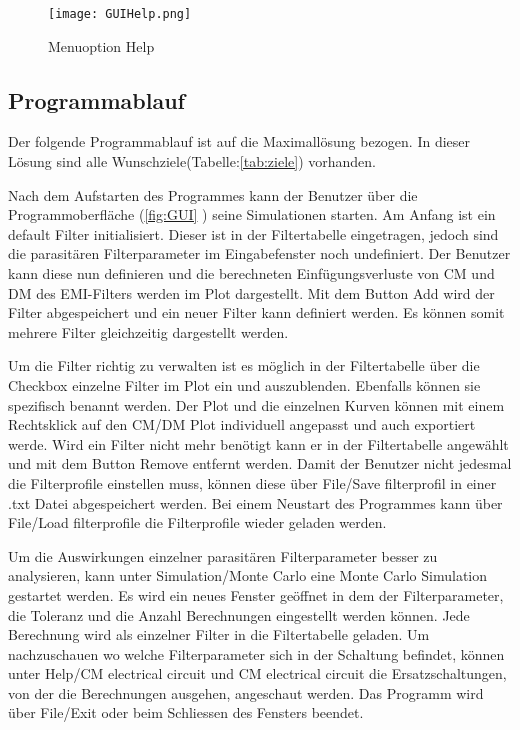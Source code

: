 \begin{figure}[H]
	\centering
	\texttt{[image: GUIHelp.png]}
	\caption{Menuoption Help}
	\label{fig:GUIHelp}
\end{figure}


\newpage

\subsection{Programmablauf} \label{subsec:programmablauf}

Der folgende Programmablauf ist auf die Maximallösung bezogen. In dieser Lösung sind alle Wunschziele(Tabelle:\ref{tab:ziele}) vorhanden.

Nach dem Aufstarten des Programmes kann der Benutzer über die Programmoberfläche (\ref{fig:GUI} ) seine Simulationen starten.
Am Anfang ist ein default Filter initialisiert. Dieser ist in der Filtertabelle eingetragen, jedoch sind die parasitären Filterparameter im Eingabefenster noch undefiniert. Der Benutzer kann diese nun definieren und die berechneten Einfügungsverluste von CM und DM des EMI-Filters werden im Plot dargestellt. Mit dem Button Add wird der Filter abgespeichert und ein neuer Filter kann definiert werden. Es können somit mehrere Filter gleichzeitig dargestellt werden. 

Um die Filter richtig zu verwalten ist es möglich in der Filtertabelle über die Checkbox einzelne Filter im Plot ein und auszublenden. Ebenfalls können sie spezifisch benannt werden. Der Plot und die einzelnen Kurven können mit einem Rechtsklick auf den CM/DM Plot individuell angepasst und auch exportiert werde. Wird ein Filter nicht mehr benötigt kann er in der Filtertabelle angewählt und mit dem Button Remove entfernt werden. Damit der Benutzer nicht jedesmal die Filterprofile einstellen muss, können diese über File/Save filterprofil in einer .txt Datei abgespeichert werden. Bei einem Neustart des Programmes kann über File/Load filterprofile die Filterprofile wieder geladen werden. 

Um die Auswirkungen einzelner parasitären Filterparameter besser zu analysieren, kann unter Simulation/Monte Carlo eine Monte Carlo Simulation gestartet werden. Es wird ein neues Fenster geöffnet in dem der Filterparameter, die Toleranz und die Anzahl Berechnungen eingestellt werden können. Jede Berechnung wird als einzelner Filter in die Filtertabelle geladen. Um nachzuschauen wo welche Filterparameter sich in der Schaltung befindet, können unter Help/CM electrical circuit und CM electrical circuit die Ersatzschaltungen, von der die Berechnungen ausgehen, angeschaut werden. Das Programm wird über File/Exit oder beim Schliessen des Fensters beendet.


